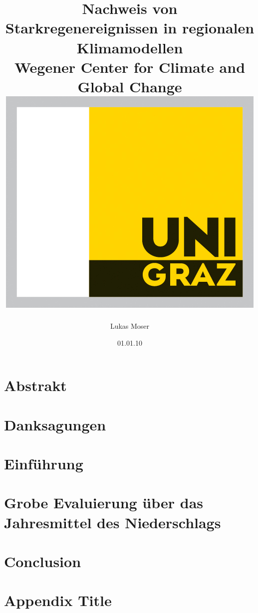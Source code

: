 \documentclass[12pt,twoside]{report}
\title{
	{Nachweis von Starkregenereignissen in regionalen Klimamodellen}\\
	{\large Wegener Center for Climate and Global Change}\\
	{\includegraphics{university.jpg}}
}
\author{Lukas Moser}
\date{01.01.10}
\begin{document}
	\maketitle
	\pagestyle{fancy}
	\chapter*{Abstrakt}
	
	\chapter*{Danksagungen}
	
	\tableofcontents
	
	\chapter{Einführung}
	

	\chapter{Grobe Evaluierung über das Jahresmittel des Niederschlags}
	
	
	
	\chapter{Conclusion}
	
	
	\appendix
	\chapter{Appendix Title}
	
	\printbibliography
\end{document}
